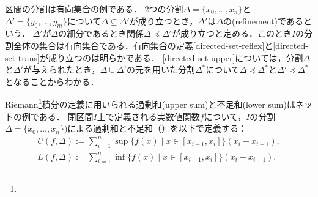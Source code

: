 \documentclass{ltjsbook}
\begin{document}
\begin{example}
区間の分割は有向集合の例である．
2つの分割\(\Delta = \{x_0, \ldots, x_n\}\)と\(\Delta' = \{y_0, \ldots, y_m\}\)について\(\Delta \subseteq \Delta' \)が成り立つとき，\(\Delta'\)は\(\Delta\)の(refinement)であるという．
\(\Delta'\)が\(\Delta\)の細分であるとき関係\(\Delta \preceq \Delta'\)が成り立つと定める．このとき\(I\)の分割全体の集合は有向集合である．有向集合の定義\ref{directed-set-reflex}と\ref{directed-set-trans}が成り立つのは明らかである．
\ref{directed-set-upper}については，分割\(\Delta\)と\(\Delta'\)が与えられたとき，\(\Delta \cup \Delta'\)の元を用いた分割\(\Delta^*\)について\(\Delta \preceq \Delta^*\)と\(\Delta' \preceq \Delta^*\)となることからわかる．

Riemann\footnote{}積分の定義に用いられる過剰和(upper sum)と不足和(lower sum)はネットの例である．
閉区間\(I\)上で定義される実数値関数\(f\)について，\(I\)の分割\(\Delta = \{x_0, \ldots, x_n\})\)による過剰和と不足和（）を以下で定義する：
\begin{gather}
    U(f, \Delta) := \sum_{i = 1}^n \sup \{ f(x) \mid x \in [x_{i - 1}, x_i] \} (x_i - x_{i - 1}), \\
    L(f, \Delta) := \sum_{i = 1}^n \inf \{ f(x) \mid x \in [x_{i - 1}, x_i] \} (x_i - x_{i - 1}).
\end{gather}
\end{example}

\end{document}
